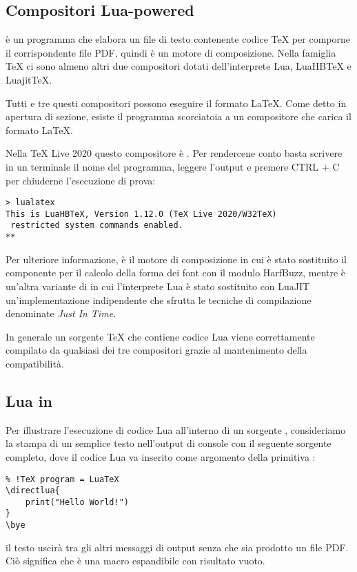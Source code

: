 \subsection{Compositori Lua-powered}

\LuaTeX{} è un programma che elabora un file di testo contenente codice \TeX{}
per comporne il corrispondente file PDF, quindi è un motore di composizione.
Nella famiglia \TeX{} ci sono almeno altri due compositori dotati
dell'interprete Lua, LuaHB\TeX{} e Luajit\TeX{}.

Tutti e tre questi compositori possono eseguire il formato \LaTeX. Come detto in
apertura di sezione, esiste il programma  scorciatoia a un
compositore che carica il formato \LaTeX.

Nella TeX Live 2020 questo compositore è . Per rendercene conto
basta scrivere in un terminale il nome del programma, leggere l'output e premere
CTRL + C per chiuderne l'esecuzione di prova:
\begin{Verbatim}
> lualatex
This is LuaHBTeX, Version 1.12.0 (TeX Live 2020/W32TeX)
 restricted system commands enabled.
**
\end{Verbatim}

Per ulteriore informazione,  è il motore di composizione
 in cui è stato sostituito il componente per il calcolo della forma
dei font con il modulo HarfBuzz, mentre  è un'altra variante di
 in cui l'interprete Lua è stato sostituito con LuaJIT
un'implementazione indipendente che sfrutta le tecniche di compilazione
denominate \emph{Just In Time}.

In generale un sorgente \TeX{} che contiene codice Lua viene correttamente
compilato da qualsiasi dei tre compositori grazie al mantenimento della
compatibilità.


\subsection{Lua in \LuaTeX}

Per illustrare l'esecuzione di codice Lua all'interno di un sorgente \LuaTeX,
consideriamo la stampa di un semplice testo nell'output di console con il
seguente sorgente completo, dove il codice Lua va inserito come argomento della
primitiva :
\begin{Verbatim}
% !TeX program = LuaTeX
\directlua{
    print("Hello World!")
}
\bye
\end{Verbatim}
il testo uscirà tra gli altri messaggi di output senza che sia prodotto un file
PDF. Ciò significa che  è una macro espandibile con risultato
vuoto.

